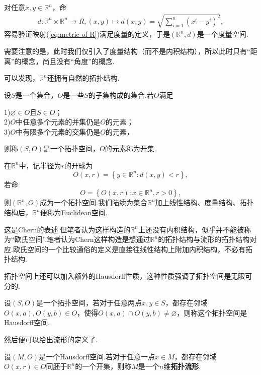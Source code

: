 	对任意$x,y\in \mathbb{R}^n$，命
	\begin{equation}\label{eq:metric of R}
		\begin{split}
			d:\mathbb{R}^n\times \mathbb{R}^n\rightarrow R,(x,y)\mapsto d(x,y)=\sqrt{\sum_{i=1}^n(x^i-y^i)^2},
		\end{split}
	\end{equation}
	容易验证映射(\ref{eq:metric of R})满足度量的定义，于是$(\mathbb{R}^n,d)$是一个度量空间.
	\begin{remark}
		需要注意的是，此时我们仅引入了度量结构（而不是内积结构），所以此时只有“距离”的概念，尚且没有“角度”的概念.
	\end{remark}
	可以发现，$\mathbb{R}^n$还拥有自然的拓扑结构.
	\begin{definition}
		设$S$是一个集合，$O$是一些$S$的子集构成的集合.若$O$满足

		1)$\varnothing\in O$且$S\in O$；\\
		2)$O$中任意多个元素的并集仍是$O$的元素；\\
		3)$O$中有限多个元素的交集仍是$O$的元素，

		则称$(S,O)$是一个拓扑空间，$O$的元素称为开集.
	\end{definition}
	在$\mathbb{R}^n$中，记半径为$r$的开球为$$O(x,r)=\left\{y\in\mathbb{R}^n:d(x,y)<r\right\},$$若命
	$$O=\left\{O(x,r):x\in\mathbb{R}^n,r>0\right\},$$
	则$(\mathbb{R}^n,O)$成为一个拓扑空间.我们陆续为集合$\mathbb{R}^n$加上线性结构、度量结构、拓扑结构后，$\mathbb{R}^n$便称为Euclidean空间.
	\begin{remark}
		这是Chern的表述.但笔者认为这样构造的$\mathbb{R}^n$上还没有内积结构，似乎并不能被称为“欧氏空间”.笔者认为Chern这样构造是想通过$\mathbb{R}^n$的拓扑结构与流形的拓扑结构对应.欧氏空间的一个比较通俗的定义是直接往线性结构上附加内积结构，不必有拓扑结构.
	\end{remark}
	拓扑空间上还可以加入额外的Hausdorff性质，这种性质强调了拓扑空间是无限可分的.
	\begin{definition}
		设$(S,O)$是一个拓扑空间，若对于任意两点$x,y\in S$，都存在邻域$O(x,a),O(y,b)\in O$，使得$O(x,a)\cap O(y,b)\neq \varnothing$，则称这个拓扑空间是Hausdorff空间.
	\end{definition}
	然后便可以给出流形的定义了.
	\begin{definition}
		设$(M,O)$是一个Hausdorff空间.若对于任意一点$x\in M$，都存在邻域$O(x,r)\in O$同胚于$\mathbb{R}^n$的一个开集，则称$M$是一个$n$维\textbf{拓扑流形}.
	\end{definition}
